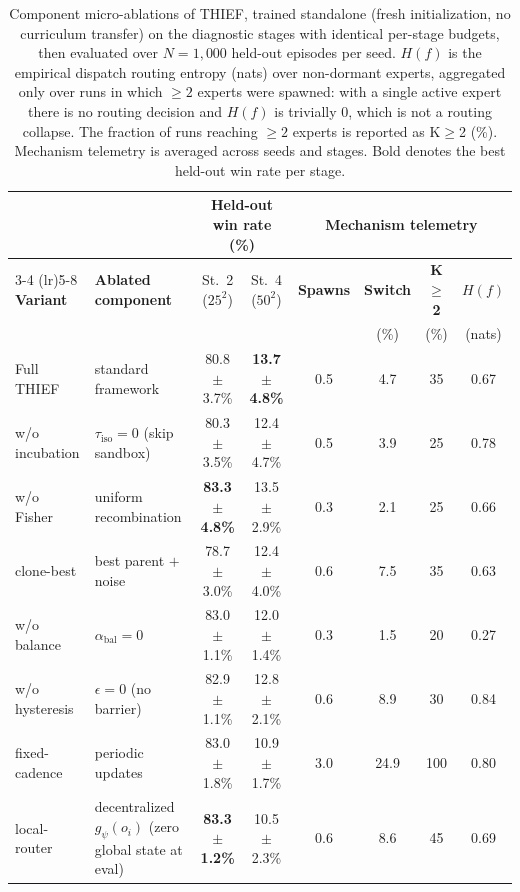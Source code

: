 \begin{table}[t]
\centering
\caption{Component micro-ablations of THIEF, trained standalone (fresh initialization, no curriculum transfer) on the diagnostic stages with identical per-stage budgets, then evaluated over $N=1,\!000$ held-out episodes per seed. $H(f)$ is the empirical dispatch routing entropy (nats) over non-dormant experts, aggregated only over runs in which $\geq 2$ experts were spawned: with a single active expert there is no routing decision and $H(f)$ is trivially $0$, which is not a routing collapse. The fraction of runs reaching $\geq 2$ experts is reported as K$\geq$2 (\%). Mechanism telemetry is averaged across seeds and stages. Bold denotes the best held-out win rate per stage.}
\label{tab:ablations}
\vspace{0.04in}
\footnotesize
\setlength{\tabcolsep}{2.5pt}
\renewcommand{\arraystretch}{1.06}
\begin{tabular}{l l cc cccc}
\toprule
 & & \multicolumn{2}{c}{\textbf{Held-out win rate (\%)}} & \multicolumn{4}{c}{\textbf{Mechanism telemetry}} \\
\cmidrule(lr){3-4} \cmidrule(lr){5-8}
\textbf{Variant} & \textbf{Ablated component} & St.~2 ($25^2$) & St.~4 ($50^2$) & \textbf{Spawns} & \textbf{Switch} & \textbf{K$\geq$2} & \textbf{$H(f)$} \\
 & & & & & (\%) & (\%) & (nats) \\
\midrule
Full THIEF & standard framework & 80.8\tiny$\pm$3.7\% & \textbf{13.7\tiny$\pm$4.8\%} & 0.5 & 4.7 & 35 & 0.67 \\
w/o incubation & $\tau_{\mathrm{iso}}=0$ (skip sandbox) & 80.3\tiny$\pm$3.5\% & 12.4\tiny$\pm$4.7\% & 0.5 & 3.9 & 25 & 0.78 \\
w/o Fisher & uniform recombination & \textbf{83.3\tiny$\pm$4.8\%} & 13.5\tiny$\pm$2.9\% & 0.3 & 2.1 & 25 & 0.66 \\
clone-best & best parent $+$ noise & 78.7\tiny$\pm$3.0\% & 12.4\tiny$\pm$4.0\% & 0.6 & 7.5 & 35 & 0.63 \\
w/o balance & $\alpha_{\mathrm{bal}}=0$ & 83.0\tiny$\pm$1.1\% & 12.0\tiny$\pm$1.4\% & 0.3 & 1.5 & 20 & 0.27 \\
w/o hysteresis & $\epsilon=0$ (no barrier) & 82.9\tiny$\pm$1.1\% & 12.8\tiny$\pm$2.1\% & 0.6 & 8.9 & 30 & 0.84 \\
fixed-cadence & periodic updates & 83.0\tiny$\pm$1.8\% & 10.9\tiny$\pm$1.7\% & 3.0 & 24.9 & 100 & 0.80 \\
local-router & decentralized $g_\psi(o_i)$ (zero global state at eval) & \textbf{83.3\tiny$\pm$1.2\%} & 10.5\tiny$\pm$2.3\% & 0.6 & 8.6 & 45 & 0.69 \\
\bottomrule
\end{tabular}
\end{table}
